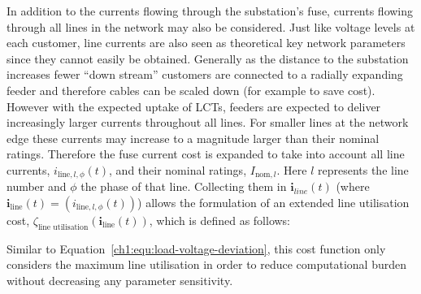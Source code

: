 In addition to the currents flowing through the substation's fuse, currents flowing through all lines in the network may also be considered.
Just like voltage levels at each customer, line currents are also seen as theoretical key network parameters since they cannot easily be obtained.
Generally as the distance to the substation increases fewer ``down stream'' customers are connected to a radially expanding feeder and therefore cables can be scaled down (for example to save cost).
However with the expected uptake of LCTs, feeders are expected to deliver increasingly larger currents throughout all lines.
For smaller lines at the network edge these currents may increase to a magnitude larger than their nominal ratings.
Therefore the fuse current cost is expanded to take into account all line currents, $i_{\text{line},l,\phi}(t)$, and their nominal ratings, $I_{\text{nom}, l}$.
Here $l$ represents the line number and $\phi$ the phase of that line.
Collecting them in $\textbf{i}_{line}(t)$ (where $\textbf{i}_\text{line}(t) = (i_{\text{line},l,\phi}(t))$) allows the formulation of an extended line utilisation cost, $\zeta_\text{line utilisation}(\textbf{i}_\text{line}(t))$, which is defined as follows:



Similar to Equation~\ref{ch1:equ:load-voltage-deviation}, this cost function only considers the maximum line utilisation in order to reduce computational burden without decreasing any parameter sensitivity.
